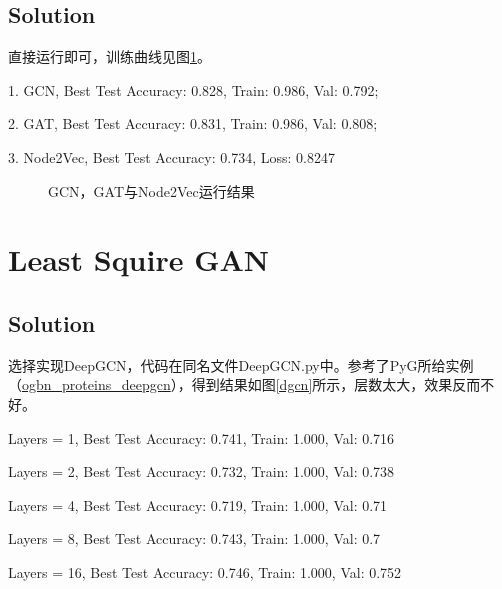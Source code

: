 \documentclass[
	12pt,
]{fphw}
\begin{document}
\subsection*{Solution} 直接运行即可，训练曲线见图\ref{gcn}。\par
1. GCN, Best Test Accuracy: 0.828, Train: 0.986, Val: 0.792;\par
2. GAT, Best Test Accuracy: 0.831, Train: 0.986, Val: 0.808;\par
3. Node2Vec, Best Test Accuracy: 0.734, Loss: 0.8247


\begin{figure}[h]
	\centering  %
	\caption{GCN，GAT与Node2Vec运行结果}
	\label{gcn}
	\end{figure}



\section*{Least Squire GAN}

\subsection*{Solution}
	

\par 选择实现DeepGCN，代码在同名文件DeepGCN.py中。参考了PyG所给实例（\href{https://github.com/pyg-team/pytorch_geometric/blob/master/examples/ogbn_proteins_deepgcn.py}{ogbn\_proteins\_deepgcn}），得到结果如图\ref{dgcn}所示，层数太大，效果反而不好。\par

Layers = 1, Best Test Accuracy: 0.741, Train: 1.000, Val: 0.716 \par

Layers = 2, Best Test Accuracy: 0.732, Train: 1.000, Val: 0.738 \par

Layers = 4, Best Test Accuracy: 0.719, Train: 1.000, Val: 0.71 \par

Layers = 8, Best Test Accuracy: 0.743, Train: 1.000, Val: 0.7 \par

Layers = 16, Best Test Accuracy: 0.746, Train: 1.000, Val: 0.752 \par
\end{document}
